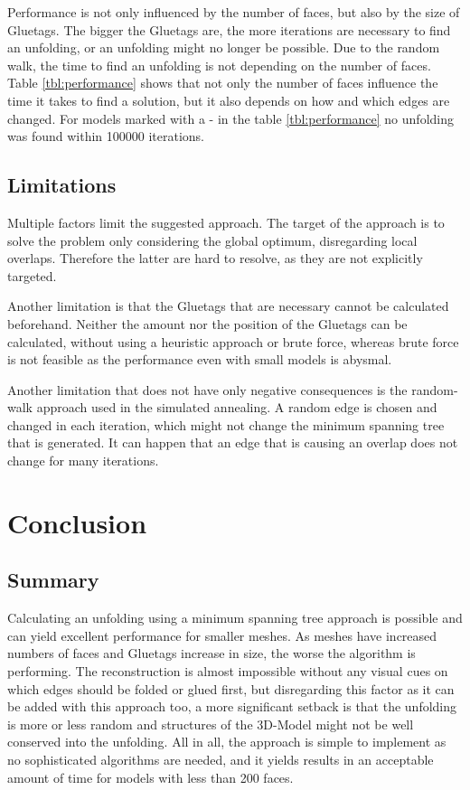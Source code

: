 \documentclass[draft,final]{vutinfth} %
\begin{document}
Performance is not only influenced by the number of faces, but also by the size of Gluetags. The bigger the Gluetags are, the more iterations are necessary to find an unfolding, or an unfolding might no longer be possible. Due to the random walk, the time to find an unfolding is not depending on the number of faces. Table \ref{tbl:performance} shows that not only the number of faces influence the time it takes to find a solution, but it also depends on how and which edges are changed. For models marked with a - in the table \ref{tbl:performance} no unfolding was found within 100000 iterations.

\section{Limitations}
\label{sec:limitations}

Multiple factors limit the suggested approach. The target of the approach is to solve the problem only considering the global optimum, disregarding local overlaps. Therefore the latter are hard to resolve, as they are not explicitly targeted.

Another limitation is that the Gluetags that are necessary cannot be calculated beforehand. Neither the amount nor the position of the Gluetags can be calculated, without using a heuristic approach or brute force, whereas brute force is not feasible as the performance even with small models is abysmal.

Another limitation that does not have only negative consequences is the random-walk approach used in the simulated annealing. A random edge is chosen and changed in each iteration, which might not change the minimum spanning tree that is generated. It can happen that an edge that is causing an overlap does not change for many iterations.

\chapter{Conclusion}
\label{chap:conclusion}

\section{Summary}
Calculating an unfolding using a minimum spanning tree approach is possible and can yield excellent performance for smaller meshes. As meshes have increased numbers of faces and Gluetags increase in size, the worse the algorithm is performing. The reconstruction is almost impossible without any visual cues on which edges should be folded or glued first, but disregarding this factor as it can be added with this approach too, a more significant setback is that the unfolding is more or less random and structures of the 3D-Model might not be well conserved into the unfolding. All in all, the approach is simple to implement as no sophisticated algorithms are needed, and it yields results in an acceptable amount of time for models with less than 200 faces.
\end{document}
